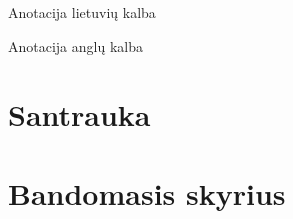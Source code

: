 \documentclass[12pt]{article}
\begin{document}
\begin{titlepage}
\centering

    {\Large Anotacija lietuvių kalba}

\end{titlepage}
\newpage


\begin{titlepage}
\centering

    {\Large Anotacija anglų kalba}

\end{titlepage}
\newpage


    \tableofcontents

\newpage


\section*{Santrauka}



    \blindtext                         %
    \par                               %
    \blindtext                         %

\newpage


\section{Bandomasis skyrius}

    \blindtext[10]                     %
\end{document}
